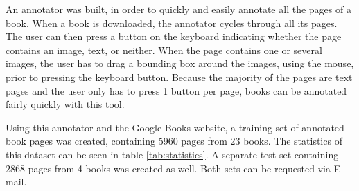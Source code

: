 \label{sec:annotator}

An annotator was built, in order to quickly and easily annotate all the pages of
a book. When a book is downloaded, the annotator cycles through all its pages.
The user can then press a button on the keyboard indicating whether the page
contains an image, text, or neither. When the page contains one or several
images, the user has to drag a bounding box around the images, using the mouse,
prior to pressing the keyboard button. Because the majority of the pages are
text pages and the user only has to press 1 button per page, books can be
annotated fairly quickly with this tool.

Using this annotator and the Google Books website, a training set of annotated
book pages was created, containing 5960 pages from 23 books. The statistics of
this dataset can be seen in table \ref{tab:statistics}. A separate test set
containing 2868 pages from 4 books was created as well. Both sets can be
requested via E-mail.
